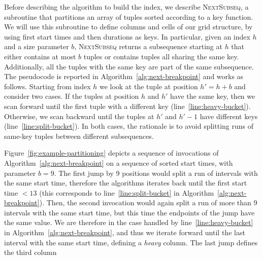 \documentclass[sigconf,nonacm,anonymous]{acmart}
\theoremstyle{definition}
\begin{document}
Before describing the algorithm to build the index, we describe
\textsc{NextSubseq}, a subroutine that partitions an array of tuples sorted
according to a key function. We will use this subroutine to define columns
and cells of our grid structure, by using first start times and then durations as keys. In particular, given an index $h$ and a size
parameter $b$, \textsc{NextSubseq} returns a subsequence starting at $h$ that
either contains at most $b$ tuples or contains tuples all sharing the same
key. Additionally, all the tuples with the same key are part of the same
subsequence. The pseudocode is reported in
Algorithm~\ref{alg:next-breakpoint} and works as follows. Starting from index
$h$ we look at the tuple at position $h' = h + b$ and consider two cases. If
the tuples at position $h$ and $h'$ have the same key, then we scan forward
until the first tuple with a different key (line~\ref{line:heavy-bucket}).
Otherwise, we scan backward until
the tuples at $h'$ and $h'-1$ have different keys (line~\ref{line:split-bucket}).
In both cases, the
rationale is to avoid splitting runs of same-key tuples between different
subsequences.

\begin{example}
Figure~\ref{fig:example-partitioning} depicts a sequence of
invocations of Algorithm~\ref{alg:next-breakpoint} on a sequence
of sorted start times, with parameter $b=9$.
The first jump by 9 positions would split a run of intervals with the
same start time, therefore the algorithms iterates back until the first
start time $< 13$ (this corresponds to line~\ref{line:split-bucket} in Algorithm~\ref{alg:next-breakpoint}).
Then, the second invocation would again split a run of more than 9 intervals
with the same start time, but this time the endpoints of the jump have the
same value. We are therefore in the case handled by line~\ref{line:heavy-bucket}
in Algorithm~\ref{alg:next-breakpoint}, and thus we iterate forward
until the last interval with the same start time, defining a \emph{heavy}
column.
The last jump defines the third column
\end{example}
\end{document}
